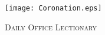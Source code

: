 \fancyhead[RE,LO]{}\fancyhead[RO,LE]{}
\fancyhead[C]{}
\thispagestyle{empty}
{}
  \begin{center}
   \texttt{[image: Coronation.eps]}
   \par
   \vspace{2ex}
   	\textsc{\Huge{Daily Office Lectionary}}
   \end{center}